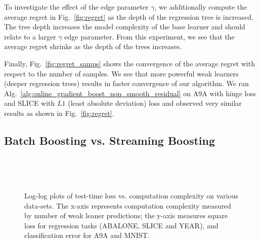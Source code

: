 To investigate the effect of the edge parameter $\gamma$, we additionally compute the average regret in Fig.~\ref{fig:regret} as the depth of the regression tree is increased. The tree depth increases the model complexity of the base learner and should relate to a larger $\gamma$ edge parameter. From this experiment, we see that the average regret shrinks as the depth of the trees increases.

Finally, Fig.~\ref{fig:regret_samps} shows the convergence of the average regret with respect to the number of samples. We see that more powerful weak learners (deeper regression trees) results in faster convergence of our algorithm. We ran Alg.~\ref{alg:online_gradient_boost_non_smooth_residual} on A9A with hinge loss and SLICE with $L1$ (least absolute deviation) loss and observed very similar results as shown in Fig.~\ref{fig:regret}. %

\subsection{Batch Boosting vs. Streaming Boosting}


\begin{figure}[th!]
    \centering
    ~
	~
    
	~
	~
    \caption{Log-log plots of test-time loss vs. computation complexity on various data-sets. The x-axis represents computation complexity measured by number of weak leaner predictions; the y-axis measures square loss for regression tasks (ABALONE, SLICE and YEAR), and classification error for A9A and MNIST. }
    \label{fig:convg}
    \vspace{-5pt}
\end{figure}


